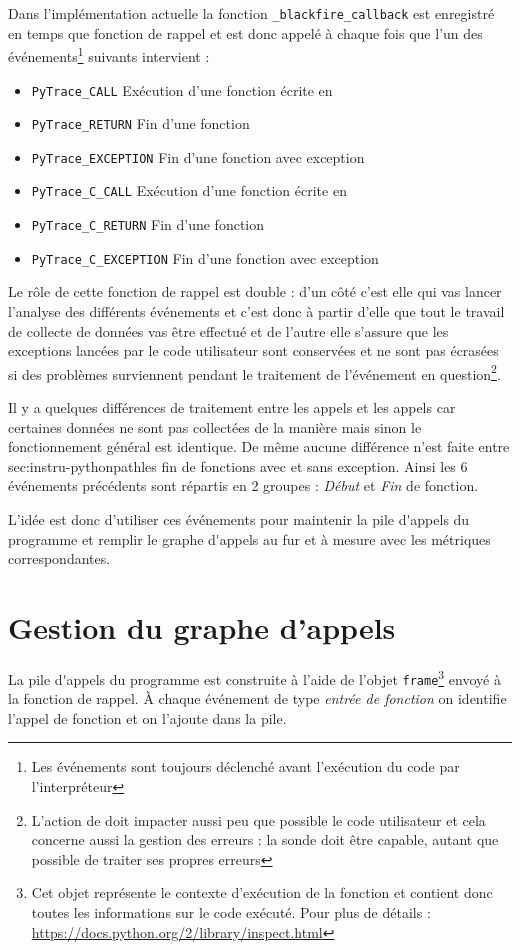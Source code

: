 Dans l'implémentation actuelle la fonction \C \verb|_blackfire_callback| est enregistré en temps que fonction de rappel et est donc appelé à chaque fois que l'un des événements\footnote{Les événements sont toujours déclenché avant l'exécution du code par l'interpréteur} suivants intervient :
\begin{itemize}
\item \verb|PyTrace_CALL| Exécution d'une fonction écrite en \Python
\item \verb|PyTrace_RETURN| Fin d'une fonction \Python
\item \verb|PyTrace_EXCEPTION| Fin d'une fonction \Python avec exception
\item \verb|PyTrace_C_CALL| Exécution d'une fonction écrite en \C
\item \verb|PyTrace_C_RETURN| Fin d'une fonction \C
\item \verb|PyTrace_C_EXCEPTION| Fin d'une fonction \C avec exception
\end{itemize}

Le rôle de cette fonction de rappel est double : d'un côté c'est elle qui vas lancer l'analyse des différents événements et c'est donc à partir d'elle que tout le travail de collecte de données vas être effectué et de l'autre elle s'assure que les exceptions lancées par le code utilisateur sont conservées et ne sont pas écrasées si des problèmes surviennent pendant le traitement de l'événement en question\footnote{L'action de \Blackfire doit impacter aussi peu que possible le code utilisateur et cela concerne aussi la gestion des erreurs : la sonde doit être capable, autant que possible de traiter ses propres erreurs}.

Il y a quelques différences de traitement entre les appels \C et les appels \Python car certaines données ne sont pas collectées de la manière mais sinon le fonctionnement général est identique. De même aucune différence n'est faite entre sec:instru-pythonpathles fin de fonctions avec et sans exception. Ainsi les 6 événements précédents sont répartis en 2 groupes : \emph{Début} et \emph{Fin} de fonction.

L'idée est donc d'utiliser ces événements pour maintenir la \gls{pile d'appels} du programme et remplir le \gls{graphe d'appels} au fur et à mesure avec les métriques correspondantes.

  \section{Gestion du graphe d'appels}
  \label{sec:gestion-graph-appels}
La \gls{pile d'appels} du programme est construite à l'aide de l'objet \verb|frame|\footnote{Cet objet représente le contexte d'exécution de la fonction et contient donc toutes les informations sur le code exécuté. Pour plus de détails : \url{https://docs.python.org/2/library/inspect.html}} envoyé à la fonction de rappel. À chaque événement de type \emph{entrée de fonction} on identifie l'appel de fonction et on l'ajoute dans la pile.
  
